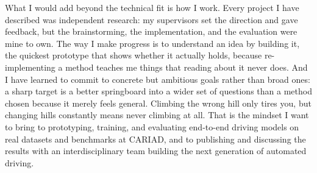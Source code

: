 \documentclass{article}
\begin{document}
What I would add beyond the technical fit is how I work. Every project I have described was independent research: my supervisors set the direction and gave feedback, but the brainstorming, the implementation, and the evaluation were mine to own. The way I make progress is to understand an idea by building it, the quickest prototype that shows whether it actually holds, because re-implementing a method teaches me things that reading about it never does. And I have learned to commit to concrete but ambitious goals rather than broad ones: a sharp target is a better springboard into a wider set of questions than a method chosen because it merely feels general. Climbing the wrong hill only tires you, but changing hills constantly means never climbing at all. That is the mindset I want to bring to prototyping, training, and evaluating end-to-end driving models on real datasets and benchmarks at CARIAD, and to publishing and discussing the results with an interdisciplinary team building the next generation of automated driving.
\end{document}
